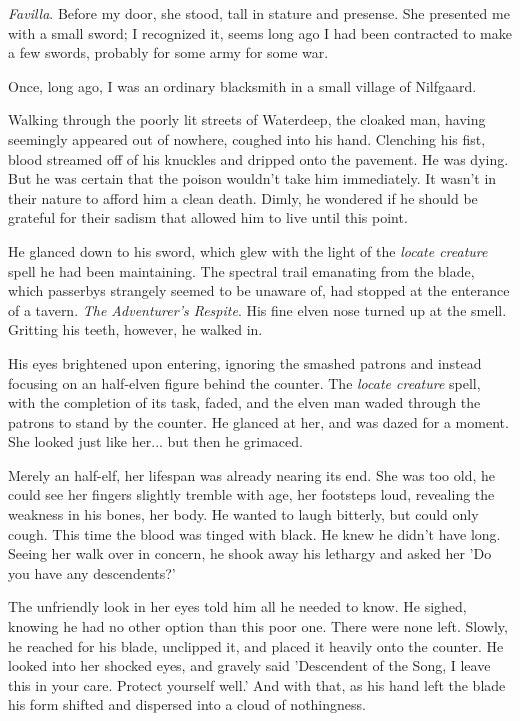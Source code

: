 \documentclass[12pt]{article}
\begin{document}
{\it Favilla}. Before my door, she stood, tall in stature and presense. She presented me with
a small sword; I recognized it, seems long ago I had been contracted to make a few swords, probably
for some army for some war.


Once, long ago, I was an ordinary blacksmith in a small village of Nilfgaard.

Walking through the poorly lit streets of Waterdeep, the cloaked man, having
seemingly appeared out of nowhere, coughed into his hand. Clenching his fist,
blood streamed off of his knuckles and dripped onto the pavement. He was dying.
But he was certain that the poison wouldn't take him immediately. It wasn't in
their nature to afford him a clean death. Dimly, he wondered if he should be
grateful for their sadism that allowed him to live until this point.

He glanced down to his sword, which glew with the light of the {\em locate
creature} spell he had been maintaining. The spectral trail emanating from the
blade, which passerbys strangely seemed to be unaware of, had stopped at the
enterance of a tavern. {\em The Adventurer's Respite}. His fine elven nose
turned up at the smell. Gritting his teeth, however, he walked in.

His eyes brightened upon entering, ignoring the smashed patrons and instead focusing
on an half-elven figure behind the counter. The {\em locate creature} spell,
with the completion of its task, faded, and the elven man waded through the
patrons to stand by the counter. He glanced at her, and was dazed for a moment.
She looked just like her... but then he grimaced.

Merely an half-elf, her lifespan was already nearing its end. She was too old,
he could see her fingers slightly tremble with age, her footsteps loud,
revealing the weakness in his bones, her body. He wanted to laugh bitterly, but
could only cough. This time the blood was tinged with black. He knew he didn't
have long. Seeing her walk over in concern, he shook away his lethargy and asked
her 'Do you have any descendents?' 

The unfriendly look in her eyes told him all he needed to know. He sighed,
knowing he had no other option than this poor one. There were none left. Slowly,
he reached for his blade, unclipped it, and placed it heavily onto the counter.
He looked into her shocked eyes, and gravely said 'Descendent of the Song,
I leave this in your care. Protect yourself well.' And with that, as his hand
left the blade his form shifted and dispersed into a cloud of nothingness.
\end{document}
